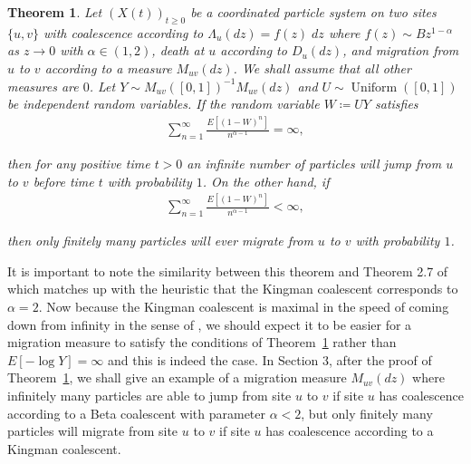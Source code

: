 \documentclass[11pt]{article}
\newtheorem{theorem}{Theorem}
\theoremstyle{definition}
\newcommand{\thmref}[1]{Theorem~\ref{T:#1}}
\begin{document}
\begin{theorem}\label{T:betasuffstrong}
    Let $(X(t))_{t \geq 0}$ be a coordinated particle system on two sites $\{u,v\}$ with coalescence according to $\Lambda_u(dz) = f(z)\;dz$ where $f(z) \sim Bz^{1-\alpha}$ as $z \to 0$ with $\alpha \in(1,2)$, death at $u$ according to $D_u(dz)$, and migration from $u$ to $v$ according to a measure $M_{uv}(dz)$. We shall assume that all other measures are $0$. Let $Y \sim M_{uv}([0,1])^{-1}M_{uv}(dz)$ and $U \sim \operatorname{Uniform}([0,1])$ be independent random variables. If the random variable $W \coloneqq UY$ satisfies
    \begin{align*}
        \sum_{n=1}^\infty \frac{E[(1-W)^{n}]}{n^{\alpha-1}} = \infty,
    \end{align*}
    
    \noindent then for any positive time $t > 0$ an infinite number of particles will jump from $u$ to $v$ before time $t$ with probability $1$. On the other hand, if
    \begin{align*}
        \sum_{n=1}^\infty \frac{E[(1-W)^{n}]}{n^{\alpha-1}} < \infty,
    \end{align*}

    \noindent then only finitely many particles will ever migrate from $u$ to $v$ with probability $1$.
\end{theorem}

\noindent It is important to note the similarity between this theorem and Theorem 2.7 of \cite{seedbank2} which matches up with the heuristic that the Kingman coalescent corresponds to $\alpha = 2$. Now because the Kingman coalescent is maximal in the speed of coming down from infinity in the sense of \cite{speed}, we should expect it to be easier for a migration measure to satisfy the conditions of \thmref{betasuffstrong} rather than $E[-\log Y] = \infty$ and this is indeed the case. In Section 3, after the proof of \thmref{betasuffstrong}, we shall give an example of a migration measure $M_{uv}(dz)$ where infinitely many particles are able to jump from site $u$ to $v$ if site $u$ has coalescence according to a Beta coalescent with parameter $\alpha < 2$, but only finitely many particles will migrate from site $u$ to $v$ if site $u$ has coalescence according to a Kingman coalescent.
\medskip
\end{document}
